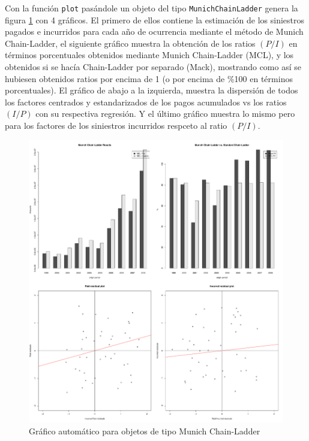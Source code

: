 \documentclass[
  12pt,
]{article}
\begin{document}
Con la función \texttt{plot} pasándole un objeto del tipo
\texttt{MunichChainLadder} genera la figura \ref{plotMunich} con 4
gráficos. El primero de ellos contiene la estimación de los siniestros
pagados e incurridos para cada año de ocurrencia mediante el método de
Munich Chain-Ladder, el siguiente gráfico muestra la obtención de los
ratios \((P/I)\) en términos porcentuales obtenidos mediante Munich
Chain-Ladder (MCL), y los obtenidos si se hacía Chain-Ladder por
separado (Mack), mostrando como así se hubiesen obtenidos ratios por
encima de 1 (o por encima de \%100 en términos porcentuales). El gráfico
de abajo a la izquierda, muestra la dispersión de todos los factores
centrados y estandarizados de los pagos acumulados vs los ratios
\((I/P)\) con su respectiva regresión. Y el último gráfico muestra lo
mismo pero para los factores de los siniestros incurridos respceto al
ratio \((P/I)\).

\begin{figure}
\centering
\includegraphics{informe_files/figure-latex/unnamed-chunk-30-1.pdf}
\caption{\label{plotMunich} Gráfico automático para objetos de tipo
Munich Chain-Ladder}
\end{figure}
\end{document}
